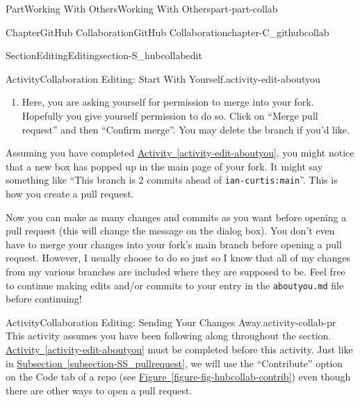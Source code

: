 \documentclass[oneside,10pt,]{book}
\newcommand{\xreffont}{\relax}
\newcommand{\mono}[1]{\texttt{#1}}
\begin{document}
\begin{partptx}{Part}{Working With Others}{}{Working With Others}{}{}{part-part-collab}
\begin{chapterptx}{Chapter}{GitHub Collaboration}{}{GitHub Collaboration}{}{}{chapter-C_githubcollab}
\begin{sectionptx}{Section}{Editing}{}{Editing}{}{}{section-S_hubcollabedit}
\begin{activity}{Activity}{Collaboration Editing: Start With Yourself.}{activity-edit-aboutyou}
\begin{enumerate}[font=\bfseries,label=(\alph*),ref=\alph*]
\begin{quote}
\mono{base: main} \faArrowLeft{} \mono{compare: <your-branch-name>}.%
\end{quote}
If not, use the dropdown menus to make yours look like the above. This means that you are taking your branch and attempting to merge your changes into the main branch from the ``base'' repository, or \emph{your repo}.%
\par
Like before, if you scroll down, you can see all of the changes you made. Later, I will be able to see this too, to make sure that you only changed what you were supposed to and didn't write anything R-rated.%
\par
Now you can create the pull request.%
\item{}Here, you are asking yourself for permission to merge into your fork. Hopefully you give yourself permission to do so. Click on ``Merge pull request'' and then ``Confirm merge''. You may delete the branch if you'd like.%
\end{enumerate}%
\end{activity}%
Assuming you have completed \hyperref[activity-edit-aboutyou]{Activity~{\xreffont\ref{activity-edit-aboutyou}}}, you might notice that a new box has popped up in the main page of your fork. It might say something like ``This branch is 2 commits ahead of \mono{ian-curtis:main}''. This is how you create a pull request.%
\par
Now you can make as many changes and commits as you want before opening a pull request (this will change the message on the dialog box). You don't even have to merge your changes into your fork's main branch before opening a pull request. However, I usually choose to do so just so I know that all of my changes from my various branches are included where they are supposed to be. Feel free to continue making edits and\slash{}or commits to your entry in the \mono{aboutyou.md} file before continuing!%
\begin{activity}{Activity}{Collaboration Editing: Sending Your Changes Away.}{activity-collab-pr}%
%
%
%
%
%
%
This activity assumes you have been following along throughout the section. \hyperref[activity-edit-aboutyou]{Activity~{\xreffont\ref{activity-edit-aboutyou}}} must be completed before this activity. Just like in \hyperref[subsection-SS_pullrequest]{Subsection~{\xreffont\ref{subsection-SS_pullrequest}}}, we will use the ``Contribute'' option on the Code tab of a repo (see \hyperref[figure-fig-hubcollab-contrib]{Figure~{\xreffont\ref{figure-fig-hubcollab-contrib}}}) even though there are other ways to open a pull request.%

\end{activity}
\end{sectionptx}
\end{chapterptx}
\end{partptx}
\end{document}
